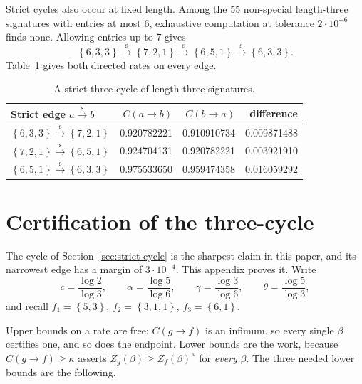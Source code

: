 \documentclass[11pt]{article}
\theoremstyle{definition}
\theoremstyle{remark}
\newcommand{\sig}[1]{\left\{#1\right\}}
\begin{document}
Strict cycles also occur at fixed length.  Among the 55 non-special
length-three signatures with entries at most \(6\), exhaustive computation at
tolerance \(2\cdot10^{-6}\) finds none.  Allowing entries up to \(7\) gives
\[
  \sig{6,3,3}
  \overset{\mathrm{s}}{\longrightarrow}\sig{7,2,1}
  \overset{\mathrm{s}}{\longrightarrow}\sig{6,5,1}
  \overset{\mathrm{s}}{\longrightarrow}\sig{6,3,3}.
\]
Table~\ref{tab:length-three-cycle} gives both directed rates on every edge.

\begin{table}[htbp]
  \centering
  \caption{A strict three-cycle of length-three signatures.}
  \label{tab:length-three-cycle}
  \begin{tabular}{@{}lrrr@{}}
    \toprule
    Strict edge \(a\overset{\mathrm{s}}{\longrightarrow}b\)
      & \(C(a\to b)\) & \(C(b\to a)\) & difference \\
    \midrule
    \(\sig{6,3,3}\overset{\mathrm{s}}{\longrightarrow}\sig{7,2,1}\)
      & 0.920782221 & 0.910910734 & 0.009871488 \\
    \(\sig{7,2,1}\overset{\mathrm{s}}{\longrightarrow}\sig{6,5,1}\)
      & 0.924704131 & 0.920782221 & 0.003921910 \\
    \(\sig{6,5,1}\overset{\mathrm{s}}{\longrightarrow}\sig{6,3,3}\)
      & 0.975533650 & 0.959474358 & 0.016059292 \\
    \bottomrule
  \end{tabular}
\end{table}


\section{Certification of the three-cycle}
\label{sec:certify}

The cycle of Section~\ref{sec:strict-cycle} is the sharpest claim in this
paper, and its narrowest edge has a margin of \(3\cdot10^{-4}\).  This
appendix proves it.  Write
\[
  c=\frac{\log2}{\log3},\qquad
  \alpha=\frac{\log5}{\log6},\qquad
  \gamma=\frac{\log3}{\log6},\qquad
  \theta=\frac{\log5}{\log3},
\]
and recall \(f_1=\sig{5,3}\), \(f_2=\sig{3,1,1}\), \(f_3=\sig{6,1}\).

Upper bounds on a rate are free: \(C(g\to f)\) is an infimum, so every single
\(\beta\) certifies one, and so does the endpoint.  Lower bounds are the work,
because \(C(g\to f)\geq\kappa\) asserts \(Z_g(\beta)\geq Z_f(\beta)^{\kappa}\)
for \emph{every} \(\beta\).  The three needed lower bounds are the following.
\end{document}
